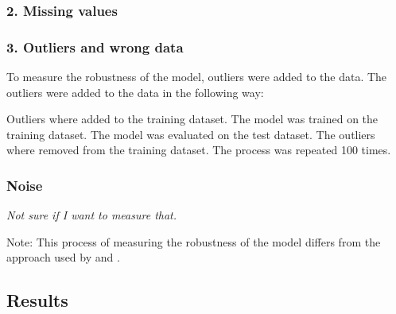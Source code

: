 \subsubsection*{2. Missing values}

\subsubsection*{3. Outliers and wrong data}
To measure the robustness of the model, outliers were added to the data. The outliers were added to the data in the following way:

Outliers where added to the training dataset.
The model was trained on the training dataset.
The model was evaluated on the test dataset.
The outliers where removed from the training dataset.
The process was repeated 100 times.

\subsubsection*{Noise}
\textit{Not sure if I want to measure that.}


Note: This process of measuring the robustness of the model differs from the approach used by \cite{siebert_constructionqualitymodel_} and \cite{saez_evaluatingclassifierbehavior_2016}.

\subsection{Results}

